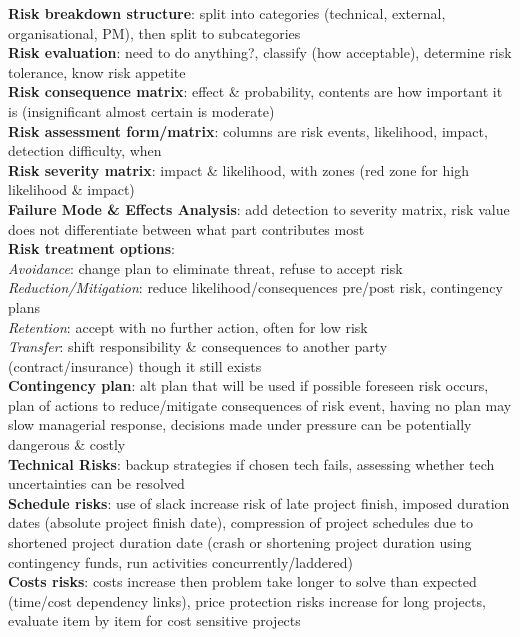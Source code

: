 \documentclass[a4paper]{article}
\begin{document}
\begin{multicols}{2}
        \textbf{Risk breakdown structure}: split into categories (technical, external, organisational, PM), then split to subcategories\\
        \textbf{Risk evaluation}: need to do anything?, classify (how acceptable), determine risk tolerance, know risk appetite\\
        \textbf{Risk consequence matrix}: effect \& probability, contents are how important it is (insignificant almost certain is moderate)\\
        \textbf{Risk assessment form/matrix}: columns are risk events, likelihood, impact, detection difficulty, when\\
        \textbf{Risk severity matrix}: impact \& likelihood, with zones (red zone for high likelihood \& impact)\\
        \textbf{Failure Mode \& Effects Analysis}: add detection to severity matrix, risk value does not differentiate between what part contributes most\\
        \textbf{Risk treatment options}:\\
        \textit{Avoidance}: change plan to eliminate threat, refuse to accept risk\\
        \textit{Reduction/Mitigation}: reduce likelihood/consequences pre/post risk, contingency plans\\
        \textit{Retention}: accept with no further action, often for low risk\\
        \textit{Transfer}: shift responsibility \& consequences to another party (contract/insurance) though it still exists\\
        \textbf{Contingency plan}: alt plan that will be used if possible foreseen risk occurs, plan of actions to reduce/mitigate consequences of risk event, having no plan may slow managerial response, decisions made under pressure can be potentially dangerous \& costly\\
        \textbf{Technical Risks}: backup strategies if chosen tech fails, assessing whether tech uncertainties can be resolved\\
        \textbf{Schedule risks}: use of slack increase risk of late project finish, imposed duration dates (absolute project finish date), compression of project schedules due to shortened project duration date (crash or shortening project duration using contingency funds, run activities concurrently/laddered)\\
        \textbf{Costs risks}: costs increase then problem take longer to solve than expected (time/cost dependency links), price protection risks increase for long projects, evaluate item by item for cost sensitive projects\\

\end{multicols}
\end{document}
